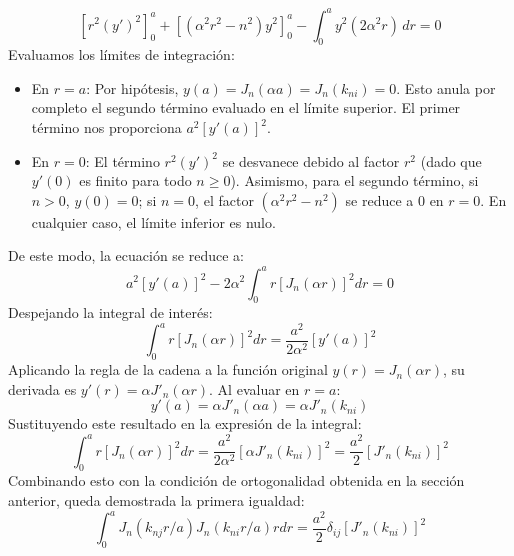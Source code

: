 \documentclass[11pt,a4paper]{article}
\begin{document}
\begin{equation}
	\left[ r^2 (y')^2 \right]_0^a + \left[ (\alpha^2 r^2 - n^2) y^2 \right]_0^a - \int_0^a y^2 (2\alpha^2 r) \, dr = 0
\end{equation}
Evaluamos los límites de integración:
\begin{itemize}
	\item En $r = a$: Por hipótesis, $y(a) = J_n(\alpha a) = J_n(k_{ni}) = 0$. Esto anula por completo el segundo término evaluado en el límite superior. El primer término nos proporciona $a^2 [y'(a)]^2$.
	\item En $r = 0$: El término $r^2 (y')^2$ se desvanece debido al factor $r^2$ (dado que $y'(0)$ es finito para todo $n \ge 0$). Asimismo, para el segundo término, si $n > 0$, $y(0) = 0$; si $n = 0$, el factor $(\alpha^2 r^2 - n^2)$ se reduce a $0$ en $r=0$. En cualquier caso, el límite inferior es nulo.
\end{itemize}
De este modo, la ecuación se reduce a:
\begin{equation}
	a^2 [y'(a)]^2 - 2\alpha^2 \int_0^a r [J_n(\alpha r)]^2 dr = 0
\end{equation}
Despejando la integral de interés:
\begin{equation}
	\int_0^a r [J_n(\alpha r)]^2 dr = \frac{a^2}{2\alpha^2} [y'(a)]^2
\end{equation}
Aplicando la regla de la cadena a la función original $y(r) = J_n(\alpha r)$, su derivada es $y'(r) = \alpha J'_n(\alpha r)$. Al evaluar en $r = a$:
\begin{equation}
	y'(a) = \alpha J'_n(\alpha a) = \alpha J'_n(k_{ni})
\end{equation}
Sustituyendo este resultado en la expresión de la integral:
\begin{equation}
	\int_0^a r [J_n(\alpha r)]^2 dr = \frac{a^2}{2\alpha^2} \left[ \alpha J'_n(k_{ni}) \right]^2 = \frac{a^2}{2} [J'_n(k_{ni})]^2
\end{equation}
Combinando esto con la condición de ortogonalidad obtenida en la sección anterior, queda demostrada la primera igualdad:
\begin{equation}
	\int_0^a J_n(k_{nj}r/a)J_n(k_{ni}r/a)rdr = \frac{a^2}{2}\delta_{ij} [J'_n(k_{ni})]^2
\end{equation}
\end{document}
